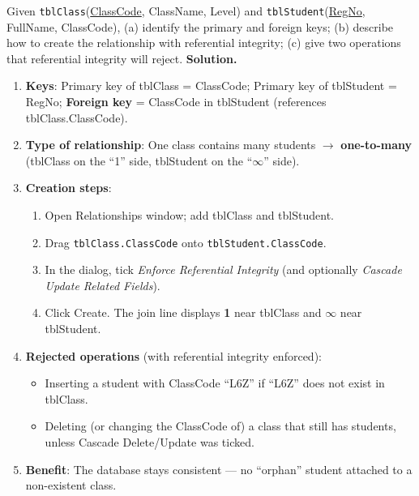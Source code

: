 \documentclass[11pt]{article}
\begin{document}
\begin{exoresolu}
Given \texttt{tblClass}(\underline{ClassCode}, ClassName, Level) and \texttt{tblStudent}(\underline{RegNo}, FullName, ClassCode), (a) identify the primary and foreign keys; (b) describe how to create the relationship with referential integrity; (c) give two operations that referential integrity will reject.
\tcblower
\textbf{Solution.}
\begin{enumerate}
\item \textbf{Keys}: Primary key of tblClass = ClassCode; Primary key of tblStudent = RegNo; \textbf{Foreign key} = ClassCode in tblStudent (references tblClass.ClassCode).
\item \textbf{Type of relationship}: One class contains many students $\rightarrow$ \textbf{one-to-many} (tblClass on the ``1'' side, tblStudent on the ``$\infty$'' side).
\item \textbf{Creation steps}:
\begin{enumerate}
\item Open Relationships window; add tblClass and tblStudent.
\item Drag \texttt{tblClass.ClassCode} onto \texttt{tblStudent.ClassCode}.
\item In the dialog, tick \emph{Enforce Referential Integrity} (and optionally \emph{Cascade Update Related Fields}).
\item Click Create. The join line displays \textbf{1} near tblClass and \textbf{$\infty$} near tblStudent.
\end{enumerate}
\item \textbf{Rejected operations} (with referential integrity enforced):
\begin{itemize}
\item Inserting a student with ClassCode ``L6Z'' if ``L6Z'' does not exist in tblClass.
\item Deleting (or changing the ClassCode of) a class that still has students, unless Cascade Delete/Update was ticked.
\end{itemize}
\item \textbf{Benefit}: The database stays consistent --- no ``orphan'' student attached to a non-existent class.
\end{enumerate}
\end{exoresolu}
\end{document}
